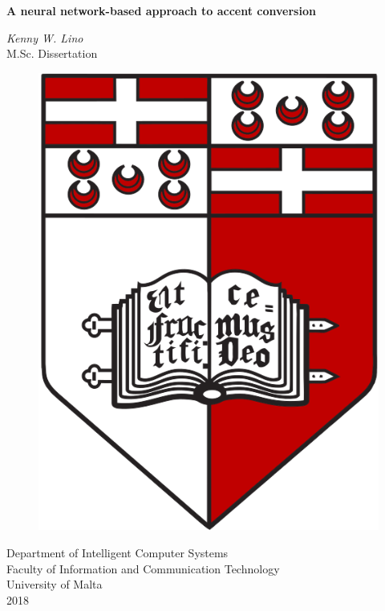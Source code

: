 \documentclass
[
    a4paper,
    twoside,
    12pt
]
{report}
\begin{document}
\begin{titlepage}
    \vspace*{1.0cm}
    \begin{center}
        \begin{Large}
        \textbf{A neural network-based approach to accent conversion} \\
        \end{Large}
        \vspace*{1.0cm}
        \textit{Kenny W. Lino} \\
        \vspace*{1.5cm}
        M.Sc. Dissertation \\
        \vspace*{0.5cm}
        \begin{figure}[H]
        \centering
        \includegraphics[scale=0.15]{img/UM-coat-of-arms.png}
    	\end{figure}
       \vspace*{1.0cm}
       Department of Intelligent Computer Systems \\
       Faculty of Information and Communication Technology \\
       University of Malta \\
       2018 \\
       

\end{center}
\end{titlepage}
\end{document}
